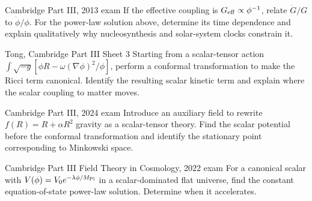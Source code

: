 \begin{exercises}
\begin{exercise}{Cambridge Part III, 2013 exam}
If the effective coupling is \(G_{\rm eff}\propto\phi^{-1}\), relate
\(\dot G/G\) to \(\dot\phi/\phi\).  For the power-law solution above,
determine its time dependence and explain qualitatively why nucleosynthesis
and solar-system clocks constrain it.
\end{exercise}

\begin{exercise}{Tong, Cambridge Part III Sheet 3}
Starting from a scalar-tensor action
\(\int\sqrt{-g}[\phi R-\omega(\nabla\phi)^2/\phi]\), perform a conformal
transformation to make the Ricci term canonical.  Identify the resulting
scalar kinetic term and explain where the scalar coupling to matter moves.
\end{exercise}

\begin{exercise}{Cambridge Part III, 2024 exam}
Introduce an auxiliary field to rewrite
\(f(R)=R+\alpha R^2\) gravity as a scalar-tensor theory.  Find the scalar
potential before the conformal transformation and identify the stationary
point corresponding to Minkowski space.
\end{exercise}

\begin{exercise}{Cambridge Part III Field Theory in Cosmology, 2022 exam}
For a canonical scalar with
\(V(\phi)=V_0e^{-\lambda\phi/M_{\rm Pl}}\) in a scalar-dominated flat
universe, find the constant equation-of-state power-law solution.  Determine
when it accelerates.
\end{exercise}



\end{exercises}


